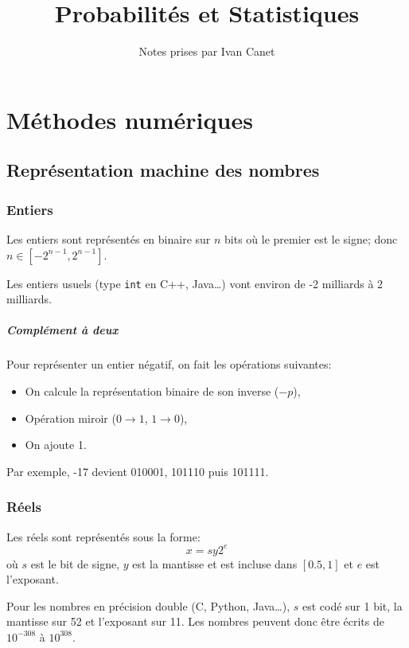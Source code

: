 \documentclass[a4paper,10pt,french,openany]{memoir}
\title{Probabilités et Statistiques}
\author{Notes prises par Ivan Canet}
\begin{document}
\maketitle
\tableofcontents

\chapter{Méthodes numériques}

\section{Représentation machine des nombres}

\subsection{Entiers}

Les entiers sont représentés en binaire sur $n$ bits où le premier est le signe; donc $n \in [-2^{n-1}, 2^{n-1}]$.

Les entiers usuels (type \lstinline{int} en C++, Java\dots) vont environ de -2 milliards à 2 milliards.

\paragraph{Complément à deux}
Pour représenter un entier négatif, on fait les opérations suivantes:
\begin{itemize}
 \item On calcule la représentation binaire de son inverse ($-p$),
 \item Opération miroir ($0 \rightarrow 1$, $1 \rightarrow 0$),
 \item On ajoute 1.
\end{itemize}

Par exemple, -17 devient 010001, 101110 puis 101111.

\subsection{Réels}

Les réels sont représentés sous la forme: \[ x = s y 2^e \] où $s$ est le bit de signe, $y$ est la mantisse et est incluse dans $[0.5, 1]$ et $e$ est l'exposant.

Pour les nombres en précision double (C, Python, Java\dots), $s$ est codé sur 1 bit, la mantisse sur 52 et l'exposant sur 11. Les nombres peuvent donc être écrits de $10^{-308}$ à $10^{308}$.
\end{document}
